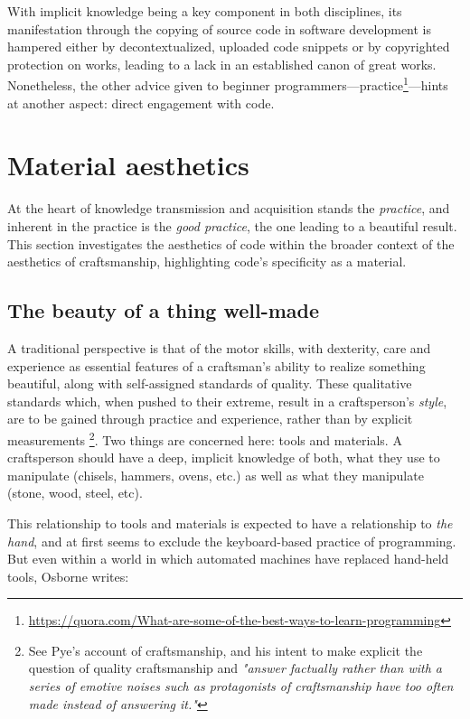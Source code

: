 \documentclass{article}
\begin{document}
With implicit knowledge being a key component in both disciplines, its manifestation through the copying of source code in software development is hampered either by decontextualized, uploaded code snippets or by copyrighted protection on works, leading to a lack in an established canon of great works. Nonetheless, the other advice given to beginner programmers---practice\footnote{\url{https://quora.com/What-are-some-of-the-best-ways-to-learn-programming}}---hints at another aspect: direct engagement with code.

\section{Material aesthetics}

At the heart of knowledge transmission and acquisition stands the \emph{practice}, and inherent in the practice is the \emph{good practice}, the one leading to a beautiful result. This section investigates the aesthetics of code within the broader context of the aesthetics of craftsmanship, highlighting code's specificity as a material.

\subsection{The beauty of a thing well-made}

A traditional perspective is that of the motor skills, with dexterity, care and experience as essential features of a craftsman's ability to realize something beautiful\cite{osborne_aesthetic_1977}, along with self-assigned standards of quality\cite{pye_nature_2008,sennett_craftsman_2009}. These qualitative standards which, when pushed to their extreme, result in a craftsperson's \emph{style}, are to be gained through practice and experience, rather than by explicit measurements\cite{pye_nature_2008} \footnote{See Pye's account of craftsmanship, and his intent to make explicit the question of quality craftsmanship and \emph{"answer factually rather than with a series of emotive noises such as protagonists of craftsmanship have too often made instead of answering it."}}. Two things are concerned here: tools and materials\cite{pye_nature_2008}. A craftsperson should have a deep, implicit knowledge of both, what they use to manipulate (chisels, hammers, ovens, etc.) as well as what they manipulate (stone, wood, steel, etc).

This relationship to tools and materials is expected to have a relationship to \emph{the hand}, and at first seems to exclude the keyboard-based practice of programming. But even within a world in which automated machines have replaced hand-held tools, Osborne writes:
\end{document}
